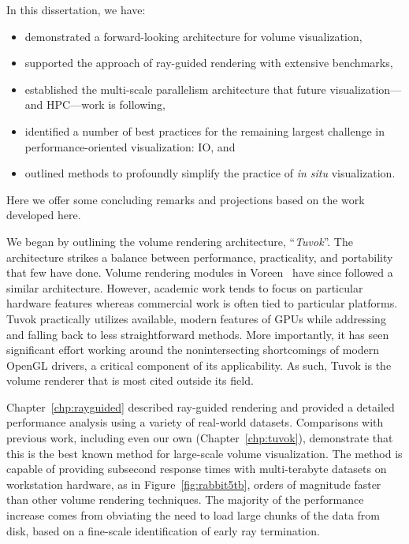 In this dissertation, we have:
\begin{itemize}
	\item demonstrated a forward-looking architecture for volume visualization,
	\item supported the approach of ray-guided rendering with extensive
benchmarks,
	\item established the multi-scale parallelism architecture that future
	visualization---and HPC---work is following,
	\item identified a number of best practices for the remaining largest
challenge in performance-oriented visualization: IO, and
	\item outlined methods to profoundly simplify the practice of \textit{in
situ} visualization.
\end{itemize}
Here we offer some concluding remarks and projections based on the work
developed here.

We began by outlining the volume rendering architecture,
``\textit{Tuvok}''.  The architecture strikes a balance between
performance, practicality, and portability that few have done.  Volume
rendering modules in Voreen~\cite{Voreen:2009} have since followed
a similar architecture.  However, academic work tends to focus on
particular hardware features whereas commercial work is often tied
to particular platforms.  Tuvok practically utilizes available,
modern features of GPUs while addressing and falling back to less
straightforward methods.  More importantly, it has seen significant
effort working around the nonintersecting shortcomings of modern OpenGL
drivers, a critical component of its applicability.  As such, Tuvok is
the volume renderer that is most cited outside its field.

Chapter~\ref{chp:rayguided} described ray-guided rendering and provided
a detailed performance analysis using a variety of real-world datasets.
Comparisons with previous work, including even our own
(Chapter~\ref{chp:tuvok}), demonstrate that this is the best known
method for large-scale volume visualization.  The method is capable of
providing subsecond response times with multi-terabyte datasets on
workstation hardware, as in Figure~\ref{fig:rabbit5tb}, orders of
magnitude faster than other volume rendering techniques.  The majority
of the performance increase comes from obviating the need to load large
chunks of the data from disk, based on a fine-scale identification of
early ray termination.


